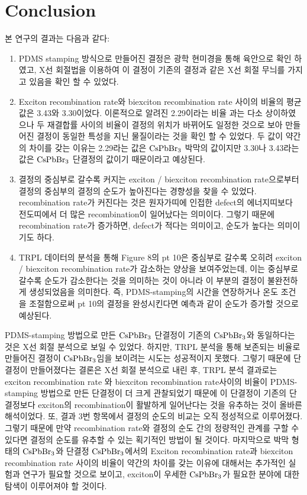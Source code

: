 \newpage

\section{Conclusion}
본 연구의 결과는 다음과 같다:
\begin{enumerate} 
	\item PDMS stamping 방식으로 만들어진 결정은 광학 현미경을 통해 육안으로 확인 하였고, X선 회절법을 이용하여 이 결정이 기존의 결정과 같은 X선 회절 무늬를 가지고 있음을 확인 할 수 있었다.
	\item	
	Exciton recombination rate와 biexciton recombination rate 사이의 비율의 평균값은 3.43와 3.30이었다. 이론적으로 알려진 2.29이라는 비율\cite{chen2018room} 과는 다소 상이하였으나 두 재결합률 사이의 비율이 결정의 위치가 바뀌어도 일정한 것으로 보아 만들어진 결정이 동일한 특성을 지닌 물질이라는 것을 확인 할 수 있었다. 두 값이 약간의 차이를 갖는 이유는 2.29라는 값은 $\rm{CsPbBr_3}$ 박막의 값이지만 3.30나 3.43라는 값은 $\rm{CsPbBr_3}$ 단결정의 값이기 때문이라고 예상된다.  
	\item 결정의 중심부로 갈수록 커지는 exciton / biexciton recombination rate으로부터 결정의 중심부의 결정의 순도가 높아진다는 경향성을 찾을 수 있었다. recombination rate가 커진다는 것은 원자가띠에 인접한 defect의 에너지띠보다 전도띠에서 더 많은 recombination이 일어났다는 의미이다. 그렇기 때문에 recombination rate가 증가하면, defect가 적다는 의미이고, 순도가 높다는 의미이기도 하다.
	\item TRPL 데이터의 분석을 통해 Figure 8의 pt 10은 중심부로 갈수록 오히려 exciton / biexciton recombination rate가 감소하는 양상을 보여주었는데, 이는 중심부로 갈수록 순도가 감소한다는 것을 의미하는 것이 아니라 이 부분의 결정이 불완전하게 생성되었음을 의미한다. 즉, PDMS-stamping의 시간을 연장하거나 온도 조건을 조절함으로써 pt 10의 결정을 완성시킨다면 예측과 같이 순도가 증가할 것으로 예상된다. 
\end{enumerate}
PDMS-stamping 방법으로 만든 $\rm{CsPbBr_3}$ 단결정이 기존의 $\rm{CsPbBr_3}$와 동일하다는 것은 X선 회절 분석으로 보일 수 있었다. 하지만, TRPL 분석을 통해 보존되는 비율로 만들어진 결정이 $\rm{CsPbBr_3}$임을 보이려는 시도는 성공적이지 못했다. 그렇기 때문에 단결정이 만들어졌다는 결론은 X선 회절 분석으로 내린 후, TRPL 분석 결과로는 exciton recombination rate 와 biexciton recombination rate사이의 비율이 PDMS-stamping 방법으로 만든 단결정이 더 크게 관찰되었기 때문에 이 단결정이 기존의 단결정보다 exciton의 recombination이 활발하게 일어난다는 것을 유추하는 것이 올바른 해석이었다.  
또, 결과 3번 항목에서 결정의 순도의 비교는 오직 정성적으로 이루어졌다. 그렇기 때문에 만약 recombination rate와 결정의 순도 간의 정량적인 관계를 구할 수 있다면 결정의 순도를 유추할 수 있는 획기적인 방법이 될 것이다.
마지막으로 박막 형태의 $\rm{CsPbBr_3}$와 단결정 $\rm{CsPbBr_3}$에서의 Exciton recombination rate과 biexciton recombination rate 사이의 비율이 약간의 차이를 갖는 이유에 대해서는 추가적인 실험과 연구가 필요할 것으로 보이고, exciton이 우세한 $\rm{CsPbBr_3}$가 필요한 분야에 대한 탐색이 이루어져야 할 것이다. 


